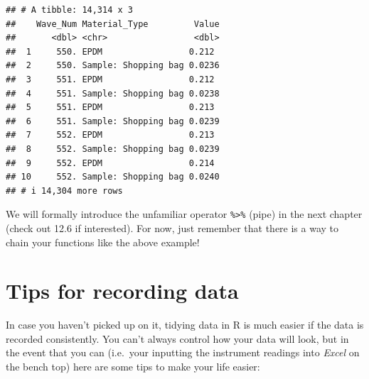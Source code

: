\documentclass[
]{book}
\begin{document}
\begin{verbatim}
## # A tibble: 14,314 x 3
##    Wave_Num Material_Type         Value
##       <dbl> <chr>                 <dbl>
##  1     550. EPDM                 0.212 
##  2     550. Sample: Shopping bag 0.0236
##  3     551. EPDM                 0.212 
##  4     551. Sample: Shopping bag 0.0238
##  5     551. EPDM                 0.213 
##  6     551. Sample: Shopping bag 0.0239
##  7     552. EPDM                 0.213 
##  8     552. Sample: Shopping bag 0.0239
##  9     552. EPDM                 0.214 
## 10     552. Sample: Shopping bag 0.0240
## # i 14,304 more rows
\end{verbatim}

We will formally introduce the unfamiliar operator \texttt{\%\textgreater{}\%} (pipe) in the next chapter (check out 12.6 if interested). For now, just remember that there is a way to chain your functions like the above example!

\hypertarget{tips-for-recording-data}{%
\section{Tips for recording data}\label{tips-for-recording-data}}

In case you haven't picked up on it, tidying data in R is much easier if the data is recorded consistently. You can't always control how your data will look, but in the event that you can (i.e.~your inputting the instrument readings into \emph{Excel} on the bench top) here are some tips to make your life easier:
\end{document}

